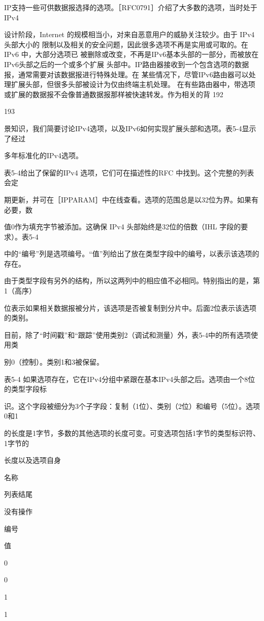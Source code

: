 IP支持一些可供数据报选择的选项。［RFC0791］介绍了大多数的选项，当时处于IPv4

设计阶段，Internet 的规模相当小，对来自恶意用户的威胁关注较少。由于 IPv4 头部大小的
限制以及相关的安全问题，因此很多选项不再是实用或可取的。在IPv6 中，大部分选项已
被删除或改变，不再是IPv6基本头部的一部分，而被放在IPv6头部之后的一个或多个扩展
头部中。IP路由器接收到一个包含选项的数据报，通常需要对该数据报进行特殊处理。在
某些情况下，尽管IPv6路由器可以处理扩展头部，但很多头部被设计为仅由终端主机处理。
在有些路由器中，带选项或扩展的数据报不会像普通数据报那样被快速转发。作为相关的背
192

193

景知识，我们简要讨论IPv4选项，以及IPv6如何实现扩展头部和选项。表5-4显示了经过

多年标准化的IPv4选项。

表5-4给出了保留的IPv4 选项，它们可在描述性的RFC 中找到。这个完整的列表会定

期更新，并可在［IPPARAM］中在线查看。选项的范围总是以32位为界。如果有必要，数

值0作为填充字节被添加。这确保 IPv4 头部始终是32位的倍数（IHL 字段的要求）。表5-4

中的“编号”列是选项编号。“值”列给出了放在类型字段中的编号，以表示该选项的存在。

由于类型字段有另外的结构，所以这两列中的相应值不必相同。特别指出的是，第1（高序）

位表示如果相关数据报被分片，该选项是否被复制到分片中。后面2位表示该选项的类别。

目前，除了“时间戳”和“跟踪”使用类别2（调试和测量）外，表5-4中的所有选项使用类

别0（控制）。类别1和3被保留。

表5-4 如果选项存在，它在IPv4分组中紧跟在基本IPv4头部之后。选项由一个8位的类型字段标

识。这个字段被细分为3个子字段：复制（1位）、类别（2位）和编号（5位）。选项0和1

的长度是1字节，多数的其他选项的长度可变。可变选项包括1字节的类型标识符、1字节的

长度以及选项自身

名称

列表结尾

没有操作

编号

值

0

0

1

1

